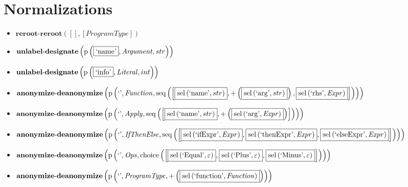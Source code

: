 \section{Normalizations}
{\footnotesize\begin{itemize}
\item $\mathbf{reroot\text{-}reroot}\left([],[\mathit{ProgramType}]\right)$
\item $\mathbf{unlabel\text{-}designate}\\\left(\mathrm{p}\left(\fbox{\text{`name'}},\mathit{Argument},str\right)\right)$
\item $\mathbf{unlabel\text{-}designate}\\\left(\mathrm{p}\left(\fbox{\text{`info'}},\mathit{Literal},int\right)\right)$
\item $\mathbf{anonymize\text{-}deanonymize}\\\left(\mathrm{p}\left(\text{`'},\mathit{Function},\mathrm{seq}\left(\left[\fbox{$\mathrm{sel}\left(\text{`name'},str\right)$}, {+}\left(\fbox{$\mathrm{sel}\left(\text{`arg'},str\right)$}\right), \fbox{$\mathrm{sel}\left(\text{`rhs'},\mathit{Expr}\right)$}\right]\right)\right)\right)$
\item $\mathbf{anonymize\text{-}deanonymize}\\\left(\mathrm{p}\left(\text{`'},\mathit{Apply},\mathrm{seq}\left(\left[\fbox{$\mathrm{sel}\left(\text{`name'},str\right)$}, {+}\left(\fbox{$\mathrm{sel}\left(\text{`arg'},\mathit{Expr}\right)$}\right)\right]\right)\right)\right)$
\item $\mathbf{anonymize\text{-}deanonymize}\\\left(\mathrm{p}\left(\text{`'},\mathit{IfThenElse},\mathrm{seq}\left(\left[\fbox{$\mathrm{sel}\left(\text{`ifExpr'},\mathit{Expr}\right)$}, \fbox{$\mathrm{sel}\left(\text{`thenExpr'},\mathit{Expr}\right)$}, \fbox{$\mathrm{sel}\left(\text{`elseExpr'},\mathit{Expr}\right)$}\right]\right)\right)\right)$
\item $\mathbf{anonymize\text{-}deanonymize}\\\left(\mathrm{p}\left(\text{`'},\mathit{Ops},\mathrm{choice}\left(\left[\fbox{$\mathrm{sel}\left(\text{`Equal'},\varepsilon\right)$}, \fbox{$\mathrm{sel}\left(\text{`Plus'},\varepsilon\right)$}, \fbox{$\mathrm{sel}\left(\text{`Minus'},\varepsilon\right)$}\right]\right)\right)\right)$
\item $\mathbf{anonymize\text{-}deanonymize}\\\left(\mathrm{p}\left(\text{`'},\mathit{ProgramType},{+}\left(\fbox{$\mathrm{sel}\left(\text{`function'},\mathit{Function}\right)$}\right)\right)\right)$

\end{itemize}}
